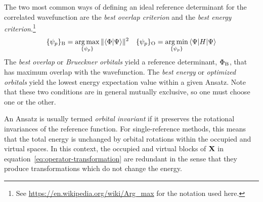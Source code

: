 \documentclass[11pt]{article}
\numberwithin{equation}{section}
\begin{document}
\begin{rmk}
The two most common ways of defining an ideal reference determinant for the correlated wavefunction are the \textit{best overlap criterion} and the \textit{best energy criterion}.\footnote{See \url{https://en.wikipedia.org/wiki/Arg_max} for the notation used here.}
\begin{align}
\label{eq:brueckner-and-oo-general-condition}
  \{\psi _p\}_{\mathrm{B}}
=
  \underset{\{\psi _p\}}{\arg\max}\,
  \|\langle\Phi |\Psi \rangle\|^2
&&
  \{\psi _p\}_{\mathrm{O}}
=
  \underset{\{\psi _p\}}{\arg\min}\,
  \langle\Psi |H|\Psi \rangle
\end{align}
The \textit{best overlap} or \textit{Brueckner orbitals} yield a reference determinant, $\Phi _{\mathrm{B}}$, that has maximum overlap with the wavefunction.
The \textit{best energy} or \textit{optimized orbitals} yield the lowest energy expectation value within a given Ansatz.
Note that these two conditions are in general mutually exclusive, so one must choose one or the other.
\end{rmk}

\begin{dfn}
An Ansatz is usually termed \textit{orbital invariant} if it preserves the rotational invariances of the reference function.
For single-reference methods, this means that the total energy is unchanged by orbital rotations within the occupied and virtual spaces.
In this context, the occupied and virtual blocks of $\mathbf{X}$ in equation~\ref{eq:operator-transformation} are redundant in the sense that they produce transformations which do not change the energy.
\end{dfn}
\end{document}
